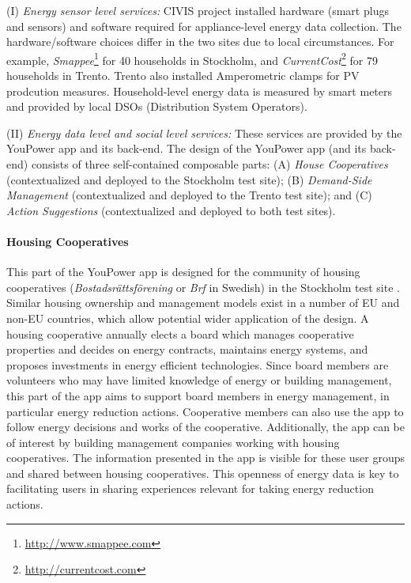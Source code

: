 (I) \textit{Energy sensor level services:} CIVIS project installed hardware (smart plugs and sensors) and
software required for appliance-level energy data collection. The hardware/software choices differ in the
two sites due to local circumstances. For example, \textit{Smappee}\footnote{\url{http://www.smappee.com}}
for 40 households in Stockholm, and \textit{CurrentCost}\footnote{\url{http://currentcost.com}} for 79
households in Trento. Trento also installed Amperometric clamps for PV prodcution measures. 
Household-level energy data is measured by smart meters and provided by local DSOs (Distribution System Operators). 

(II) \textit{Energy data level and social level services:} These services are provided by the YouPower
app and its back-end. The design of the YouPower app (and its back-end) consists of three self-contained
composable parts: (A) \textit{House Cooperatives} (contextualized and deployed to the Stockholm test site);
(B) \textit{Demand-Side Management} (contextualized and deployed
to the Trento test site); and (C) \textit{Action Suggestions} (contextualized and deployed to both test sites).


\paragraph{Housing Cooperatives}

This part of the YouPower app is designed for the community of housing cooperatives (\textit{Bostadsr{\"a}ttsf{\"o}rening} or \textit{Brf} in Swedish) in the Stockholm test site \cite{Hasselqvist2016}.
Similar housing ownership and management models exist in a number of EU and non-EU countries, which allow potential wider application of the design.
A housing cooperative annually elects a board which manages cooperative properties and decides on energy contracts, maintains energy systems, and proposes investments in energy efficient technologies. Since board members are volunteers who may have limited knowledge of energy or building management, this part of the app aims to support board members in energy management, in particular energy reduction actions. Cooperative members can also use the app to follow energy decisions and works of the cooperative. Additionally, the app can be of interest by building management companies working with housing cooperatives. 
The information presented in the app is visible for these user
groups and shared between housing cooperatives. This openness of energy data is key to
facilitating  users in sharing experiences relevant for taking energy reduction actions.\\


